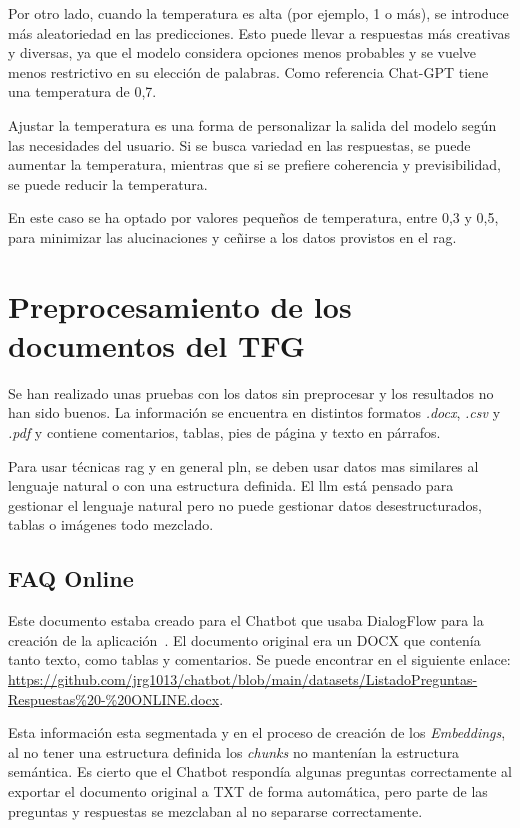 Por otro lado, cuando la temperatura es alta (por ejemplo, 1 o más), se introduce más aleatoriedad en las predicciones. Esto puede llevar a respuestas más creativas y diversas, ya que el modelo considera opciones menos probables y se vuelve menos restrictivo en su elección de palabras. Como referencia Chat-GPT tiene una temperatura de 0,7.

Ajustar la temperatura es una forma de personalizar la salida del modelo según las necesidades del usuario. Si se busca variedad en las respuestas, se puede aumentar la temperatura, mientras que si se prefiere coherencia y previsibilidad, se puede reducir la temperatura.

En este caso se ha optado por valores pequeños de temperatura, entre 0,3 y 0,5, para minimizar las alucinaciones y ceñirse a los datos provistos en el \acrshort{rag}.

\section{Preprocesamiento de los documentos del TFG}\label{Preprocesamiento}

Se han realizado unas pruebas con los datos sin preprocesar y los resultados no han sido buenos. La información se encuentra en distintos formatos \textit{.docx}, \textit{.csv} y \textit{.pdf} y contiene  comentarios, tablas, pies de página y texto en párrafos. 

Para usar técnicas \acrshort{rag} y en general \acrshort{pln}, se deben usar datos mas similares al lenguaje natural o con una estructura definida. El \acrshort{llm} está pensado para gestionar el lenguaje natural pero no puede gestionar datos desestructurados, tablas o imágenes todo mezclado.

\subsection{FAQ Online}

Este documento estaba creado para el Chatbot que usaba DialogFlow para la creación de la aplicación~\cite{UBU-Chatbot}. El documento original era un DOCX que contenía tanto texto, como tablas y comentarios. Se puede encontrar en el siguiente enlace: \url{https://github.com/jrg1013/chatbot/blob/main/datasets/ListadoPreguntas-Respuestas%20-%20ONLINE.docx}.

Esta información esta segmentada y en el proceso de creación de los \textit{Embeddings}, al no tener una estructura definida los \textit{chunks} no mantenían la estructura semántica. Es cierto que el Chatbot respondía algunas preguntas correctamente al exportar el documento original a TXT de forma automática, pero parte de las preguntas y respuestas se mezclaban al no separarse correctamente.

